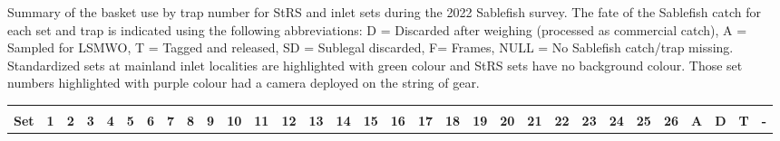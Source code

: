 \documentclass[12pt]{article}\usepackage[]{graphicx}\usepackage[]{color}
\begin{document}
\begin{appendices}
Summary of the basket use by trap number for StRS and inlet sets during the 2022 Sablefish survey. The fate of the Sablefish catch for each set and trap is indicated using the following abbreviations: D = Discarded after weighing (processed as commercial catch), A = Sampled for LSMWO, T = Tagged and released, SD = Sublegal discarded, F= Frames, NULL = No Sablefish catch/trap missing. Standardized sets at mainland inlet localities are highlighted with green colour and StRS sets have no background colour. Those set numbers highlighted with purple colour had a camera deployed on the string of gear.
\begin{landscape}\begingroup\fontsize{6}{8}\selectfont
\begin{longtable}{>{\raggedright\arraybackslash}p{0.8cm}>{\raggedright\arraybackslash}p{0.3cm}>{\raggedright\arraybackslash}p{0.3cm}>{\raggedright\arraybackslash}p{0.3cm}>{\raggedright\arraybackslash}p{0.3cm}>{\raggedright\arraybackslash}p{0.3cm}>{\raggedright\arraybackslash}p{0.3cm}>{\raggedright\arraybackslash}p{0.3cm}>{\raggedright\arraybackslash}p{0.3cm}>{\raggedright\arraybackslash}p{0.3cm}>{\raggedright\arraybackslash}p{0.4cm}>{\raggedright\arraybackslash}p{0.4cm}>{\raggedright\arraybackslash}p{0.4cm}>{\raggedright\arraybackslash}p{0.4cm}>{\raggedright\arraybackslash}p{0.4cm}>{\raggedright\arraybackslash}p{0.4cm}>{\raggedright\arraybackslash}p{0.4cm}>{\raggedright\arraybackslash}p{0.4cm}>{\raggedright\arraybackslash}p{0.4cm}>{\raggedright\arraybackslash}p{0.4cm}>{\raggedright\arraybackslash}p{0.4cm}>{\raggedright\arraybackslash}p{0.4cm}>{\raggedright\arraybackslash}p{0.4cm}>{\raggedright\arraybackslash}p{0.4cm}>{\raggedright\arraybackslash}p{0.4cm}>{\raggedright\arraybackslash}p{0.4cm}>{\raggedright\arraybackslash}p{0.4cm}>{\raggedleft\arraybackslash}p{0.2cm}>{\raggedleft\arraybackslash}p{0.2cm}>{\raggedleft\arraybackslash}p{0.2cm}>{\raggedleft\arraybackslash}p{0.2cm}}
\toprule
\multicolumn{1}{c}{\textbf{ }} & \multicolumn{26}{c}{\textbf{Trap}} & \multicolumn{4}{c}{\textbf{Total}} \\
\cmidrule(l{3pt}r{3pt}){2-27} \cmidrule(l{3pt}r{3pt}){28-31}
\textbf{Set} & \textbf{1} & \textbf{2} & \textbf{3} & \textbf{4} & \textbf{5} & \textbf{6} & \textbf{7} & \textbf{8} & \textbf{9} & \textbf{10} & \textbf{11} & \textbf{12} & \textbf{13} & \textbf{14} & \textbf{15} & \textbf{16} & \textbf{17} & \textbf{18} & \textbf{19} & \textbf{20} & \textbf{21} & \textbf{22} & \textbf{23} & \textbf{24} & \textbf{25} & \textbf{26} & \textbf{A} & \textbf{D} & \textbf{T} & \textbf{-}\\

\end{longtable}
\end{landscape}
\end{appendices}
\end{document}
